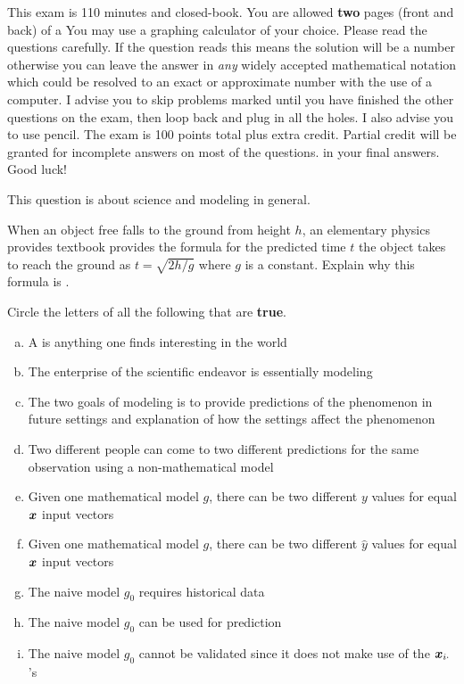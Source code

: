 \documentclass[12pt]{article}
\begin{document}
This exam is 110 minutes and closed-book. You are allowed \textbf{two} pages (front and back) of a  You may use a graphing calculator of your choice. Please read the questions carefully. If the question reads  this means the solution will be a number otherwise you can leave the answer in \textit{any} widely accepted mathematical notation which could be resolved to an exact or approximate number with the use of a computer. I advise you to skip problems marked  until you have finished the other questions on the exam, then loop back and plug in all the holes. I also advise you to use pencil. The exam is 100 points total plus extra credit. Partial credit will be granted for incomplete answers on most of the questions.  in your final answers. Good luck!

\pagebreak

\problem This question is about science and modeling in general.

\benum
{} When an object free falls to the ground from height $h$, an elementary physics provides textbook provides the formula for the predicted time $t$ the object takes to reach the ground as $t = \sqrt{2h/g}$ where $g$ is a constant. Explain why this formula is .

 Circle the letters of all the following that are \textbf{true}.

\begin{enumerate}[(a)]
\item A  is anything one finds interesting in the world
\item The enterprise of the scientific endeavor is essentially modeling
\item The two goals of modeling is to provide predictions of the phenomenon in future settings and explanation of how the settings affect the phenomenon 
\item Two different people can come to two different predictions for the same observation using a non-mathematical model
\item Given one mathematical model $g$, there can be two different $y$ values for equal $\boldsymbol{x}$ input vectors
\item Given one mathematical model $g$, there can be two different $\hat{y}$ values for equal $\boldsymbol{x}$ input vectors
\item The naive model $g_0$ requires historical data
\item The naive model $g_0$ can be used for prediction
\item The naive model $g_0$ cannot be validated since it does not make use of the $\boldsymbol{x}_{i\cdot}$'s

\end{enumerate}
\end{document}
